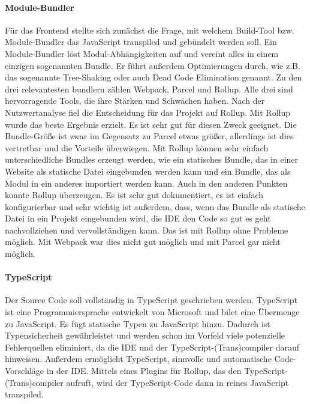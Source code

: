 \paragraph{Module-Bundler} Für das Frontend stellte sich zunächst die Frage, mit welchem Build-Tool bzw. Module-Bundler das JavaScript transpiled und gebündelt werden soll. Ein Module-Bundler löst Modul-Ab\-häng\-ig\-kei\-ten auf und vereint alles in einem einzigen sogenannten Bundle. Er führt außerdem Optimierungen durch, wie z.B. das sogenannte Tree-Shaking oder auch Dead Code Elimination genannt. Zu den drei relevantesten bundlern zählen Webpack, Parcel und Rollup. Alle drei sind hervorragende Tools, die ihre Stärken und Schwächen haben. Nach der Nutzwertanalyse fiel die Entscheidung für das Projekt auf Rollup. Mit Rollup wurde das beste Ergebnis erzielt. Es ist sehr gut für diesen Zweck geeignet. Die Bundle-Größe ist zwar im Gegensatz zu Parcel etwas größer, allerdings ist dies vertretbar und die Vorteile überwiegen. Mit Rollup können sehr einfach unterschiedliche Bundles erzeugt werden, wie ein statisches Bundle, das in einer Website als statische Datei eingebunden werden kann und ein Bundle, das als Modul in ein anderes importiert werden kann. Auch in den anderen Punkten konnte Rollup überzeugen. Es ist sehr gut dokumentiert, es ist einfach konfigurierbar und sehr wichtig ist außerdem, dass, wenn das Bundle als statische Datei in ein Projekt eingebunden wird, die IDE den Code so gut es geht nachvollziehen und vervollständigen kann. Das ist mit Rollup ohne Probleme möglich. Mit Webpack war dies nicht gut möglich und mit Parcel gar nicht möglich. 


\paragraph{TypeScript} Der Source Code soll vollständig in TypeScript geschrieben werden. TypeScript ist eine Programmiersprache entwickelt von Microsoft und bilet eine Übermenge zu JavaScript. Es fügt statische Typen zu JavaScript hinzu. Dadurch ist Typensicherheit gewährleistet und werden schon im Vorfeld viele potenzielle Fehlerquellen eliminiert, da die IDE und der TypeScript-(Trans)compiler darauf hinweisen. Außerdem ermöglicht TypeScript, sinnvolle und automatische Code-Vorschläge in der IDE. 
Mittels eines Plugins für Rollup, das den TypeScript-(Trans)compiler aufruft, wird der TypeScript-Code dann in reines JavaScript transpiled. 

